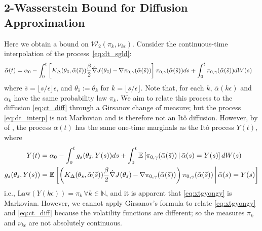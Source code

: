 \documentclass[journal,onecolumn]{IEEEtran}
\newcommand{\alk}{\alpha_k}
\newcommand{\thk}{\theta_k}
\newcommand{\step}{\epsilon}
\newcommand{\grad}{\nabla}
\newcommand{\gradn}{\hat{\nabla}}
\newcommand{\rew}{J}
\newcommand{\CE}{\mathbb{E}}
\newcommand{\browns}{W(s)}
\newcommand{\altbar}{\bar{\alpha}(t)}
\newcommand{\alsbar}{\bar{\alpha}(s)}
\newcommand{\sbar}{\bar{s}}
\newcommand{\wass}{\mathcal{W}_2}
\newcommand{\K}{K}
\newcommand{\Kd}{\K_{\Delta}}
\newcommand{\alsbbar}{\bar{\alpha}(\sbar)}
\newcommand{\yt}{Y(t)}
\newcommand{\dtlaw}{\ids_{k}} %
\newcommand{\ctlaw}{\nu_{k\step}}
\newcommand{\N}{\mathbb{N}}
\newcommand{\ids}{\pi}
\newcommand{\idw}{\gamma}
\newcommand{\isp}{0,\idw}
\newcommand{\ksp}{k,\idw}
\newcommand{\idistrw}{\ids_{\isp}}
\begin{document}
{\subsection{2-Wasserstein Bound for Diffusion Approximation}
\label{subsec:diffapprox}
Here we obtain a bound on $\wass(\dtlaw,\ctlaw)$. 
 Consider the continuous-time interpolation of the process~\eqref{eq:dt_sgld}: 
 \begin{align}
 \begin{split}
 \label{eq:dt_interp}
 \altbar = \alpha_0 &- \int_0^t \left[\Kd(\theta_{\sbar}, \alsbbar) \frac{\beta}{2} \gradn\rew(\theta_{\sbar}) \,\color{black}{-}\, \grad\idistrw(\alsbbar)\right]\idistrw(\alsbbar)ds + \int_0^t\idistrw(\alsbbar)d\browns
\end{split}
\end{align}
where $\sbar = \lfloor s/\step \rfloor \step$, and $\theta_{\sbar} := \thk$ for $k=\lfloor s/\step \rfloor$. Note that, for each $k$, $\bar{\alpha}(k\step)$ and $\alk$ have the same probability law $\dtlaw$. We aim to relate this process to the diffusion \eqref{eq:ct_diff} through a Girsanov change of measure; but the process \eqref{eq:dt_interp} is not Markovian and is therefore not an It\^o diffusion. However, by \color{black}{Theorem 4.6} of \cite{gyongy1986mimicking}, the process $\altbar$ has the same one-time marginals as the It\^o process $\yt$, where
\begin{gather}
\begin{aligned}
\begin{split}
\label{eq:xtgyongy}
\yt &= \alpha_0 - \int_0^t g_s(\theta_{\sbar},Y(s))ds + \int_0^t\CE\left[ \idistrw(\alsbbar) \,\vert \,\alsbar = Y(s) \right]d\browns\\
g_s(\theta_{\sbar}, Y(s)) &= \CE\left[\left(\Kd(\theta_{\sbar},\alsbbar)\frac{\beta}{2}\gradn \rew(\theta_{\sbar}) \,\color{black}{-}\,\grad\idistrw(\alsbbar)\right)\idistrw(\alsbbar) \, \bigg| \, \alsbar = Y(s) \right]
\end{split}
\end{aligned}\raisetag{-1.3\baselineskip}
\end{gather}
i.e., $\textrm{Law}(Y(k\step)) = \dtlaw \,\forall k \in \N$, and it is apparent that \eqref{eq:xtgyongy} is Markovian. 
However, we cannot apply Girsanov's formula to relate \eqref{eq:xtgyongy} and \eqref{eq:ct_diff} because the volatility functions are different; so the measures $\dtlaw$ and $\ctlaw$ are not absolutely continuous.

}
\end{document}
